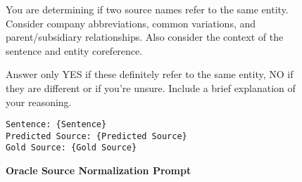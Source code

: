 
\begin{figure*}[!ht]
\centering
\small
\caption{\textbf{Oracle Source Normalization Prompt}}
\begin{tcolorbox}[
    width=\textwidth,
    colback=white,
    colframe=black,
    arc=4mm,
    boxrule=0.5pt,
    left=2mm,
    right=2mm,
    top=2mm,
    bottom=2mm,
    fonttitle=\bfseries,
    ]
\begin{tcolorbox}[
    colback=SeaGreen!8,
    boxrule=0pt,
    colframe=white,
    left=0pt,
    right=0pt,
    top=0pt,
    bottom=0pt,
    ]
    
\small
You are determining if two source names refer to the same entity.
Consider company abbreviations, common variations, and parent/subsidiary relationships. Also consider the context of the sentence and entity coreference.
\bigskip

Answer only YES if these definitely refer to the same entity, NO if they are different or if you're unsure.
Include a brief explanation of your reasoning.
\begin{tcolorbox}[
    colback=SkyBlue!10,
    boxrule=0pt,
    colframe=white,
    left=0pt,
    right=0pt,
    top=0pt,
    bottom=0pt,
    ]
\begin{verbatim}
Sentence: {Sentence}
Predicted Source: {Predicted Source}
Gold Source: {Gold Source}
\end{verbatim}
\end{tcolorbox}
\end{tcolorbox}
\end{tcolorbox}
\label{fig:source_normalization_prompt}
\end{figure*}
